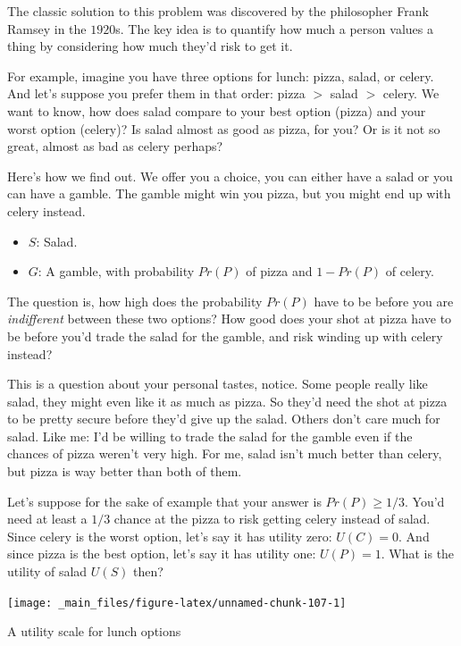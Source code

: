 \documentclass[justified]{tufte-book}
\providecommand{\tightlist}{%
  \setlength{\itemsep}{0pt}\setlength{\parskip}{0pt}}
\renewcommand{\u}{U}
\newcommand{\gt}{>}
\newcommand{\p}{Pr}
\theoremstyle{definition}
\theoremstyle{definition}
\theoremstyle{definition}
\theoremstyle{remark}
\begin{document}
The classic solution to this problem was discovered by the philosopher
Frank Ramsey in the \(1920\)s. The key idea is to quantify how much a
person values a thing by considering how much they'd risk to get it.

For example, imagine you have three options for lunch: pizza, salad, or
celery. And let's suppose you prefer them in that order: pizza \(\gt\)
salad \(\gt\) celery. We want to know, how does salad compare to your
best option (pizza) and your worst option (celery)? Is salad almost as
good as pizza, for you? Or is it not so great, almost as bad as celery
perhaps?

Here's how we find out. We offer you a choice, you can either have a
salad or you can have a gamble. The gamble might win you pizza, but you
might end up with celery instead.

\begin{itemize}
\tightlist
\item
  \(S\): Salad.
\item
  \(G\): A gamble, with probability \(\p(P)\) of pizza and \(1-\p(P)\)
  of celery.
\end{itemize}

The question is, how high does the probability \(\p(P)\) have to be
before you are \emph{indifferent} between these two options? How good
does your shot at pizza have to be before you'd trade the salad for the
gamble, and risk winding up with celery instead?

This is a question about your personal tastes, notice. Some people
really like salad, they might even like it as much as pizza. So they'd
need the shot at pizza to be pretty secure before they'd give up the
salad. Others don't care much for salad. Like me: I'd be willing to
trade the salad for the gamble even if the chances of pizza weren't very
high. For me, salad isn't much better than celery, but pizza is way
better than both of them.

Let's suppose for the sake of example that your answer is
\(\p(P) \geq 1/3\). You'd need at least a \(1/3\) chance at the pizza to
risk getting celery instead of salad. Since celery is the worst option,
let's say it has utility zero: \(\u(C)=0\). And since pizza is the best
option, let's say it has utility one: \(\u(P)=1\). What is the utility
of salad \(\u(S)\) then?

\begin{marginfigure}
\texttt{[image: \_main\_files/figure-latex/unnamed-chunk-107-1]} \caption[A utility scale for lunch options]{A utility scale for lunch options}\label{fig:unnamed-chunk-107}
\end{marginfigure}
\end{document}
